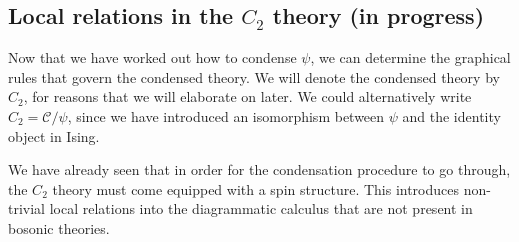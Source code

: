 \documentclass[12pt,a4paper]{article}
\newcommand{\mcc}{\mathcal{C}}
\newcommand{\PsiEnd}{\mathord{\vcenter{\hbox{\texttt{[image: PsiEnd.pdf]}}}}}
\newcommand{\PsiEndExchange}{\mathord{\vcenter{\hbox{\texttt{[image: PsiEndExchange.pdf]}}}}}
\begin{document}

 
\subsection{Local relations in the $C_2$ theory (in progress)}
Now that we have worked out how to condense $\psi$, we can determine the graphical rules that govern the condensed theory. 
We will denote the condensed theory by $C_2$, for reasons that we will elaborate on later. We could alternatively write $C_2 = \mcc/\psi$, since we have introduced an isomorphism between $\psi$ and the identity object in Ising.

We have already seen that in order for the condensation procedure to go through, the $C_2$ theory must come equipped with a spin structure. This introduces non-trivial local relations into the diagrammatic calculus that are not present in bosonic theories.  
\end{document}
